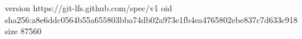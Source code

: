 version https://git-lfs.github.com/spec/v1
oid sha256:a8e6ddc0564b55a655803bba74db02a973e1fb4ea4765802ebe837c7d633c918
size 87560
